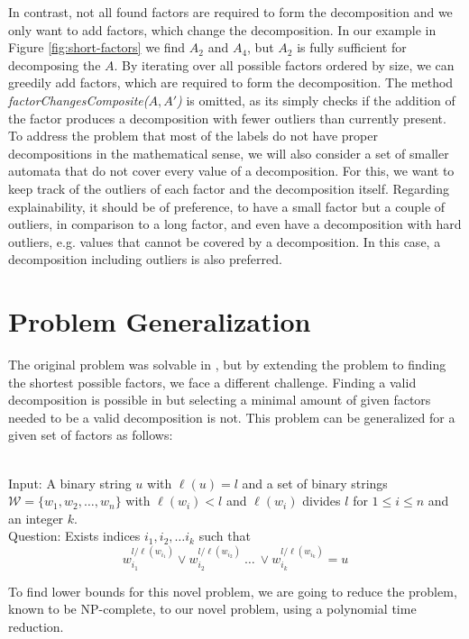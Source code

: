 In contrast, not all found factors are required to form the decomposition and we only want to add factors, which change the decomposition.
In our example in Figure \ref{fig:short-factors} we find $A_2$ and $A_4$, but $A_2$ is fully sufficient for decomposing the \DFA $A$.
By iterating over all possible factors ordered by size, we can greedily add factors, which are required to form the decomposition.
The method \textit{factorChangesComposite($A,A'$)} is omitted, as its simply checks if the addition of the factor produces a decomposition with fewer outliers than currently present.
To address the problem that most of the labels do not have proper decompositions in the mathematical sense, we will also consider a set of smaller automata that do not cover every value of a decomposition.
For this, we want to keep track of the outliers of each factor and the decomposition itself.
Regarding explainability, it should be of preference, to have a small factor but a couple of outliers, in comparison to a long factor, and even have a decomposition with hard outliers, e.g. values that cannot be covered by a decomposition.
In this case, a decomposition including outliers is also preferred.

\section{Problem Generalization}
The original problem was solvable in \LogSpace, but by extending the problem to finding the shortest possible factors, we face a different challenge.
Finding a valid decomposition is possible in \LogSpace but selecting a minimal amount of given factors needed to be a valid decomposition is not.
This problem can be generalized for a given set of factors as follows:
\begin{defn}{\ \\}
	Input: A binary string $u$ with $\ell(u)= l$ and a set of binary strings $\mathcal{W} = \{w_1, w_2, \dots, w_n\}$ with $\ell(w_i) < l$ and $\ell(w_i)$ divides $l$ for $1 \leq i \leq n$ and an integer $k$.\\
	Question: Exists indices $i_1, i_2, \dots i_k$ such that
	$$w_{i_1}^{l / \ell(w_{i_1})} \lor w_{i_2}^{l / \ell(w_{i_2})} ~\dots~ \lor w_{i_k}^{l / \ell(w_{i_k})} = u $$
\end{defn}

To find lower bounds for this novel problem, we are going to reduce the {} problem, known to be NP-complete, to our novel {} problem, using a polynomial time reduction.


